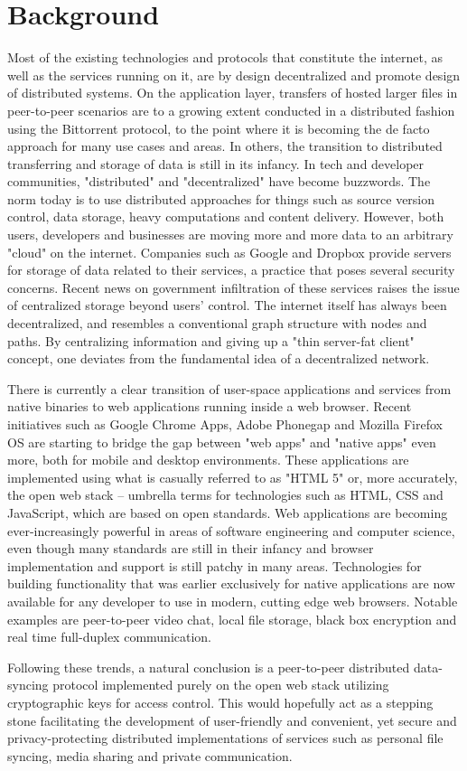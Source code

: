 \section{Background}
Most of the existing technologies and protocols that constitute the internet, as well as the services running on it, are by design decentralized and promote design of distributed systems. On the application layer, transfers of hosted larger files in peer-to-peer scenarios are to a growing extent conducted in a distributed fashion using the Bittorrent protocol, to the point where it is becoming the de facto approach for many use cases and areas. In others, the transition to distributed transferring and storage of data is still in its infancy. In tech and developer communities, "distributed" and "decentralized" have become buzzwords. The norm today is to use distributed approaches for things such as source version control, data storage, heavy computations and content delivery.
However, both users, developers and businesses are moving more and more data to an arbitrary "cloud" on the internet. Companies such as Google and Dropbox provide servers for storage of data related to their services, a practice that poses several security concerns. Recent news on government infiltration of these services raises the issue of centralized storage beyond users' control. The internet itself has always been decentralized, and resembles a conventional graph structure with nodes and paths. By centralizing information and giving up a "thin server-fat client" concept, one deviates from the fundamental idea of a decentralized network.

There is currently a clear transition of user-space applications and services from native binaries to web applications running inside a web browser. Recent initiatives such as Google Chrome Apps, Adobe Phonegap and Mozilla Firefox OS are starting to bridge the gap between "web apps" and "native apps" even more, both for mobile and desktop environments. These applications are implemented using what is casually referred to as "HTML 5" or, more accurately, the open web stack – umbrella terms for technologies such as HTML, CSS and JavaScript, which are based on open standards. Web applications are becoming ever-increasingly powerful in areas of software engineering and computer science, even though many standards are still in their infancy and browser implementation and support is still patchy in many areas. Technologies for building functionality that was earlier exclusively for native applications are now available for any developer to use in modern, cutting edge web browsers. Notable examples are peer-to-peer video chat, local file storage, black box encryption and real time full-duplex communication.

Following these trends, a natural conclusion is a peer-to-peer distributed data-syncing protocol implemented purely on the open web stack utilizing cryptographic keys for access control. This would hopefully act as a stepping stone facilitating the development of user-friendly and convenient, yet secure and privacy-protecting distributed implementations of services such as personal file syncing, media sharing and private communication.

